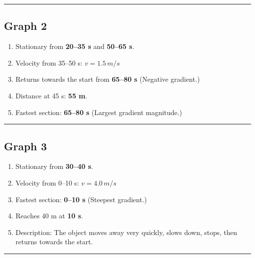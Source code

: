 \documentclass[12pt]{article}
\begin{document}
\hrule
\vspace{4mm}

\subsection*{Graph 2}

\begin{enumerate}[label=\textbf{2.\arabic*}]
  \item Stationary from \textbf{20--35 s} and \textbf{50--65 s}.

  \item Velocity from 35--50 s:  
  $v = 1.5\,\si{m/s}$

  \item Returns towards the start from \textbf{65--80 s}  
  (Negative gradient.)

  \item Distance at 45 s: \textbf{55 m}.

  \item Fastest section: \textbf{65--80 s}  
  (Largest gradient magnitude.)
\end{enumerate}

\hrule
\vspace{4mm}

\subsection*{Graph 3}

\begin{enumerate}[label=\textbf{3.\arabic*}]
  \item Stationary from \textbf{30--40 s}.

  \item Velocity from 0--10 s:  
  $v = 4.0\,\si{m/s}$

  \item Fastest section: \textbf{0--10 s}  
  (Steepest gradient.)

  \item Reaches 40 m at \textbf{10 s}.

  \item Description:  
  The object moves away very quickly, slows down, stops, then returns towards the start.
\end{enumerate}

\hrule
\vspace{4mm}

\end{document}
